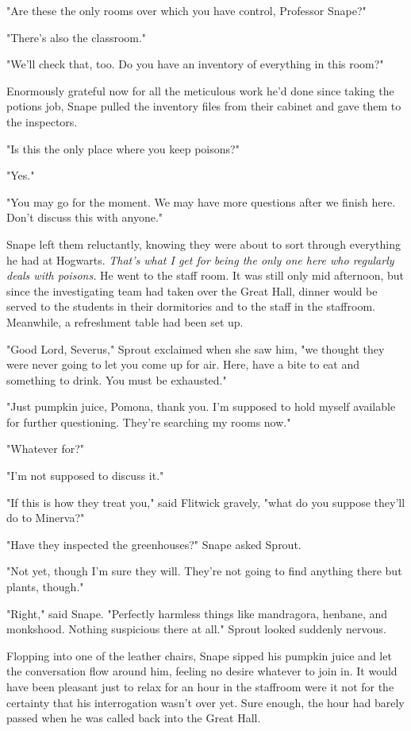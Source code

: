 "Are these the only rooms over which you have control, Professor Snape?"

"There's also the classroom."

"We'll check that, too. Do you have an inventory of everything in this room?"

Enormously grateful now for all the meticulous work he'd done since taking the potions job, Snape pulled the inventory files from their cabinet and gave them to the inspectors.

"Is this the only place where you keep poisons?"

"Yes."

"You may go for the moment. We may have more questions after we finish here. Don't discuss this with anyone."

Snape left them reluctantly, knowing they were about to sort through everything he had at Hogwarts. \emph{That's what I get for being the only one here who regularly deals with poisons.} He went to the staff room. It was still only mid afternoon, but since the investigating team had taken over the Great Hall, dinner would be served to the students in their dormitories and to the staff in the staffroom. Meanwhile, a refreshment table had been set up.

"Good Lord, Severus," Sprout exclaimed when she saw him, "we thought they were never going to let you come up for air. Here, have a bite to eat and something to drink. You must be exhausted."

"Just pumpkin juice, Pomona, thank you. I'm supposed to hold myself available for further questioning. They're searching my rooms now."

"Whatever for?"

"I'm not supposed to discuss it."

"If this is how they treat you," said Flitwick gravely, "what do you suppose they'll do to Minerva?"

"Have they inspected the greenhouses?" Snape asked Sprout.

"Not yet, though I'm sure they will. They're not going to find anything there but plants, though."

"Right," said Snape. "Perfectly harmless things like mandragora, henbane, and monkshood. Nothing suspicious there at all." Sprout looked suddenly nervous.

Flopping into one of the leather chairs, Snape sipped his pumpkin juice and let the conversation flow around him, feeling no desire whatever to join in. It would have been pleasant just to relax for an hour in the staffroom were it not for the certainty that his interrogation wasn't over yet. Sure enough, the hour had barely passed when he was called back into the Great Hall.

